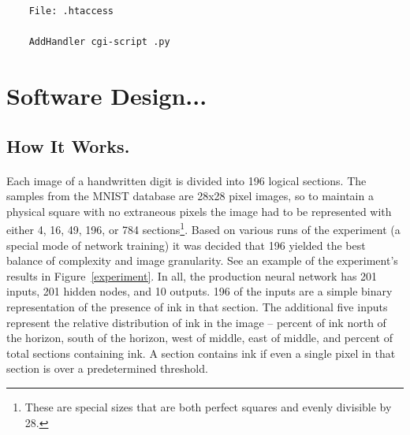 \documentclass{article}
\begin{document}
    \begin{lstlisting}
    File: .htaccess

    AddHandler cgi-script .py
    \end{lstlisting}

\section{Software Design...}

\subsection{How It Works.}

    \paragraph{}Each image of a handwritten digit is divided into 196 logical 
    sections. The samples from the MNIST database are 28x28 pixel images, so to 
    maintain a physical square with no extraneous pixels the image had to be 
    represented with either 4, 16, 49, 196, or 784 sections\footnote{These are 
    special sizes that are both perfect squares and evenly divisible by 28.}. 
    Based on various runs of the experiment (a special mode of network training) 
    it was decided that 196 yielded the best balance of complexity and image 
    granularity. See an example of the experiment's results in 
    Figure~\ref{experiment}. In all, the production neural network has 201 inputs,
    201 hidden nodes, and 10 outputs. 196 of the inputs are a simple binary 
    representation of the presence of ink in that section. The additional five 
    inputs represent the relative distribution of ink in the image -- percent of
    ink north of the horizon, south of the horizon, west of middle, east of 
    middle, and percent of total sections containing ink. A section contains 
    ink if even a single pixel in that section is over a predetermined threshold.
\end{document}
